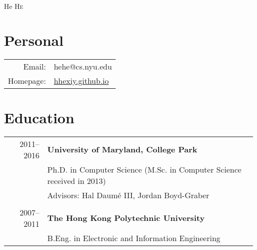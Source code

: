 \documentclass[a4paper,11pt]{article}
\begin{document}
\pagestyle{empty} %

\par{\centering
        {\Huge He \textsc{He}
    }\bigskip\par}

\section{Personal}

\begin{tabular}{rl}
    Email:     & hehe@cs.nyu.edu \\
	Homepage:  & \url{hhexiy.github.io}	
\end{tabular}


\section{Education}
\begin{tabular}{rl}    
2011--2016 & \textbf{University of Maryland, College Park}\\
    & Ph.D. in Computer Science (M.Sc. in Computer Science received in 2013) \\
    & Advisors: Hal Daum\'e III, Jordan Boyd-Graber \\
\\
2007--2011 & \textbf{The Hong Kong Polytechnic University}\\
& B.Eng. in Electronic and Information Engineering
\end{tabular}
\end{document}
